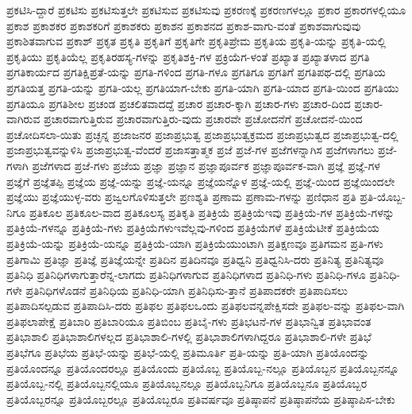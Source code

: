 {ಪ್ರಕಟಿಸಿ-ದ್ದಾರೆ
ಪ್ರಕಟಿಸು
ಪ್ರಕಟಿಸುತ್ತಲೇ
ಪ್ರಕಟಿಸುವ
ಪ್ರಕಟಿಸುವು
ಪ್ರಕರಣಕ್ಕೆ
ಪ್ರಕರಣಗಳಲ್ಲೂ
ಪ್ರಕಾರ
ಪ್ರಕಾರಗಳಲ್ಲಿಯೂ
ಪ್ರಕಾಶ
ಪ್ರಕಾಶಕರ
ಪ್ರಕಾಶಕರಿಗೆ
ಪ್ರಕಾಶಕರು
ಪ್ರಕಾಶನ
ಪ್ರಕಾಶನದ
ಪ್ರಕಾಶ-ವಾಗು-ವಂತೆ
ಪ್ರಕಾಶವಾಗುವುವು
ಪ್ರಕಾಶಿತವಾಗುವ
ಪ್ರಕಾಶ್
ಪ್ರಕೃತ
ಪ್ರಕೃತಿ
ಪ್ರಕೃತಿಗೆ
ಪ್ರಕೃತಿಗೇ
ಪ್ರಕೃತಿಪ್ರೇಮ
ಪ್ರಕೃತಿಯ
ಪ್ರಕೃತಿ-ಯನ್ನು
ಪ್ರಕೃತಿ-ಯಲ್ಲಿ
ಪ್ರಕೃತಿಯು
ಪ್ರಕೃತಿಯೆಲ್ಲ
ಪ್ರಕೃತಿರಹಸ್ಯ-ಗಳನ್ನು
ಪ್ರಕೃತಿಶಕ್ತಿ-ಗಳ
ಪ್ರಕ್ರಿಯೆಗ-ಳಂತೆ
ಪ್ರಖ್ಯಾತ
ಪ್ರಖ್ಯಾತಳಾದ
ಪ್ರಗತಿ
ಪ್ರಗತಿಕಾರ್ಯದ
ಪ್ರಗತಿಕ್ಷಿಪ್ರತೆ-ಯನ್ನು
ಪ್ರಗತಿ-ಗಳಿಂದ
ಪ್ರಗತಿ-ಗಳೂ
ಪ್ರಗತಿಗೂ
ಪ್ರಗತಿಗೆ
ಪ್ರಗತಿಪಥ-ದಲ್ಲಿ
ಪ್ರಗತಿಯ
ಪ್ರಗತಿಯತ್ತ
ಪ್ರಗತಿ-ಯನ್ನು
ಪ್ರಗತಿ-ಯಲ್ಲ
ಪ್ರಗತಿಯಾಗ-ಬೇಕು
ಪ್ರಗತಿ-ಯಾಗಿ
ಪ್ರಗತಿ-ಯಾದ
ಪ್ರಗತಿ-ಯಿಂದ
ಪ್ರಗತಿಯು
ಪ್ರಗತಿಯೂ
ಪ್ರಗತಿಶೀಲ
ಪ್ರಚಂಡ
ಪ್ರಚಲಿತವಾದದ್ದೆ
ಪ್ರಚಾರ
ಪ್ರಚಾರ-ಕ್ಕಾಗಿ
ಪ್ರಚಾರ-ಗಳು
ಪ್ರಚಾರ-ದಿಂದ
ಪ್ರಚಾರ-ವಾಗಿರುವ
ಪ್ರಚಾರವಾಗುತ್ತಿರುವ
ಪ್ರಚಾರವಾಗುತ್ತಿರು-ವುದು
ಪ್ರಚಾರವೇ
ಪ್ರಚೋದನೆಗೆ
ಪ್ರಚೋದನೆ-ಯಿಂದ
ಪ್ರಚೋದಿಸಲಾ-ಯಿತು
ಪ್ರಚ್ಛನ್ನ
ಪ್ರಜಾಜನರ
ಪ್ರಜಾಪ್ರಭುತ್ವ
ಪ್ರಜಾಪ್ರಭುತ್ವಕ್ರಮದ
ಪ್ರಜಾಪ್ರಭುತ್ವದ
ಪ್ರಜಾಪ್ರಭುತ್ವ-ದಲ್ಲಿ
ಪ್ರಜಾಪ್ರಭುತ್ವವನ್ನುಳಿಸಿ
ಪ್ರಜಾಪ್ರಭುತ್ವ-ವೆಂದರೆ
ಪ್ರಜಾಸತ್ತಾತ್ಮಕ
ಪ್ರಜೆ
ಪ್ರಜೆ-ಗಳ
ಪ್ರಜೆಗಳನ್ನಾಗಿಸ
ಪ್ರಜೆಗಳಾಗಲು
ಪ್ರಜೆ-ಗಳಾಗಿ
ಪ್ರಜೆಗಳಾದ
ಪ್ರಜೆ-ಗಳು
ಪ್ರಜೆಯ
ಪ್ರಜ್ಞಾ
ಪ್ರಜ್ಞಾನ
ಪ್ರಜ್ಞಾಪೂರ್ವಕ
ಪ್ರಜ್ಞಾಪೂರ್ವಕ-ವಾಗಿ
ಪ್ರಜ್ಞೆ
ಪ್ರಜ್ಞೆ-ಗಳ
ಪ್ರಜ್ಞೆಗೆ
ಪ್ರಜ್ಞೆತಪ್ಪಿ
ಪ್ರಜ್ಞೆಯ
ಪ್ರಜ್ಞೆ-ಯನ್ನು
ಪ್ರಜ್ಞೆ-ಯನ್ನೂ
ಪ್ರಜ್ಞೆಯನ್ನೊಳ
ಪ್ರಜ್ಞೆ-ಯಲ್ಲಿ
ಪ್ರಜ್ಞೆ-ಯಿಂದ
ಪ್ರಜ್ಞೆಯಿಂದಲೇ
ಪ್ರಜ್ಞೆಯು
ಪ್ರಜ್ಞೆಯುಳ್ಳ-ವರು
ಪ್ರಜ್ವಲಗೊಳಿಸುತ್ತಲೇ
ಪ್ರಣಶ್ಯತಿ
ಪ್ರಣಾಮ
ಪ್ರಣಾಮ-ಗಳನ್ನು
ಪ್ರಣಿಧಾನ
ಪ್ರತಿ
ಪ್ರತಿ-ಯೊಬ್ಬ-ನಿಗೂ
ಪ್ರತಿಕೂಲ
ಪ್ರತಿಕೂಲ-ವಾದ
ಪ್ರತಿಕೂಲಸ್ಯ
ಪ್ರತಿಕೃತಿ
ಪ್ರತಿಕ್ರಿಯೆ
ಪ್ರತಿಕ್ರಿಯೆಇವು
ಪ್ರತಿಕ್ರಿಯೆ-ಗಳ
ಪ್ರತಿಕ್ರಿಯೆ-ಗಳನ್ನು
ಪ್ರತಿಕ್ರಿಯೆ-ಗಳನ್ನೂ
ಪ್ರತಿಕ್ರಿಯೆ-ಗಳು
ಪ್ರತಿಕ್ರಿಯೆಗಳುಇವೆಲ್ಲವು-ಗಳಿಂದ
ಪ್ರತಿಕ್ರಿಯೆಗಳೆ
ಪ್ರತಿಕ್ರಿಯೆಟೀಕೆ
ಪ್ರತಿಕ್ರಿಯೆಯ
ಪ್ರತಿಕ್ರಿಯೆ-ಯನ್ನು
ಪ್ರತಿಕ್ರಿಯೆ-ಯನ್ನೂ
ಪ್ರತಿಕ್ರಿಯೆ-ಯಾಗಿ
ಪ್ರತಿಕ್ರಿಯೆಯುಂಟಾಗಿ
ಪ್ರತಿಕ್ಷಣವೂ
ಪ್ರತಿಗಮನ
ಪ್ರತಿ-ಗಳು
ಪ್ರತಿಗಾಮಿ
ಪ್ರತಿಜ್ಞಾ
ಪ್ರತಿಜ್ಞೆ
ಪ್ರತಿಜ್ಞೆಯನ್ನೇ
ಪ್ರತಿದಿನ
ಪ್ರತಿದಿನವೂ
ಪ್ರತಿಧ್ವನಿ
ಪ್ರತಿಧ್ವನಿಸಿ-ದರು
ಪ್ರತಿನಿತ್ಯ
ಪ್ರತಿನಿತ್ಯವೂ
ಪ್ರತಿನಿಧಿ
ಪ್ರತಿನಿಧಿಗಳಾಗುತ್ತಾರೆನ್ನ-ಲಾಗದು
ಪ್ರತಿನಿಧಿಗಳಾಗುವ
ಪ್ರತಿನಿಧಿಗಳಾದ
ಪ್ರತಿನಿಧಿ-ಗಳು
ಪ್ರತಿನಿಧಿ-ಗಳೂ
ಪ್ರತಿನಿಧಿ-ಗಳೇ
ಪ್ರತಿನಿಧಿಗಳೊಡನೆ
ಪ್ರತಿನಿಧಿಯ
ಪ್ರತಿನಿಧಿ-ಯಾಗಿ
ಪ್ರತಿನಿಧಿಸು-ತ್ತಾನೆ
ಪ್ರತಿಪಾದಕರೇ
ಪ್ರತಿಪಾದಿಸಲು
ಪ್ರತಿಪಾದಿಸಲ್ಪಡುವ
ಪ್ರತಿಪಾದಿಸಿ-ದರು
ಪ್ರತಿಫಲ
ಪ್ರತಿಫಲಒಂದು
ಪ್ರತಿಫಲವನ್ನಪೇಕ್ಷಿಸದೇ
ಪ್ರತಿಫಲ-ವನ್ನು
ಪ್ರತಿಫಲ-ವಾಗಿ
ಪ್ರತಿಫಲಾಪೇಕ್ಷೆ
ಪ್ರತಿಬಾರಿ
ಪ್ರತಿಬಾರಿಯೂ
ಪ್ರತಿಬಿಂಬ
ಪ್ರತಿಬೈ-ಗಳು
ಪ್ರತಿಭಟನೆ-ಗಳ
ಪ್ರತಿಭಾನ್ವಿತ
ಪ್ರತಿಭಾವಂತ
ಪ್ರತಿಭಾಶಾಲಿ
ಪ್ರತಿಭಾಶಾಲಿಗಳಲ್ಲದ
ಪ್ರತಿಭಾಶಾಲಿ-ಗಳಲ್ಲಿ
ಪ್ರತಿಭಾಶಾಲಿಗಳಾಗಿದ್ದರೂ
ಪ್ರತಿಭಾಶಾಲಿ-ಗಳೇ
ಪ್ರತಿಭೆ
ಪ್ರತಿಭೆಗೂ
ಪ್ರತಿಭೆಯ
ಪ್ರತಿಭೆ-ಯನ್ನು
ಪ್ರತಿಭೆ-ಯಲ್ಲಿ
ಪ್ರತಿಮೂರ್ತಿ
ಪ್ರತಿ-ಯನ್ನು
ಪ್ರತಿ-ಯಾಗಿ
ಪ್ರತಿಯೊಂದನ್ನು
ಪ್ರತಿಯೊಂದನ್ನೂ
ಪ್ರತಿಯೊಂದರಲ್ಲೂ
ಪ್ರತಿಯೊಂದು
ಪ್ರತಿಯೊಬ್ಬ
ಪ್ರತಿಯೊಬ್ಬ-ನಲ್ಲೂ
ಪ್ರತಿಯೊಬ್ಬನ
ಪ್ರತಿಯೊಬ್ಬನನ್ನೂ
ಪ್ರತಿಯೊಬ್ಬ-ನಲ್ಲಿ
ಪ್ರತಿಯೊಬ್ಬನಲ್ಲಿಯೂ
ಪ್ರತಿಯೊಬ್ಬನಲ್ಲೂ
ಪ್ರತಿಯೊಬ್ಬನಿಗೂ
ಪ್ರತಿಯೊಬ್ಬನೂ
ಪ್ರತಿಯೊಬ್ಬರ
ಪ್ರತಿಯೊಬ್ಬರನ್ನೂ
ಪ್ರತಿಯೊಬ್ಬರಲ್ಲೂ
ಪ್ರತಿಯೊಬ್ಬರೂ
ಪ್ರತಿವರ್ಷವೂ
ಪ್ರತಿಷ್ಠಾಪನೆ
ಪ್ರತಿಷ್ಠಾಪನೆಯ
ಪ್ರತಿಷ್ಠಾಪಿಸ-ಬೇಕು
}
